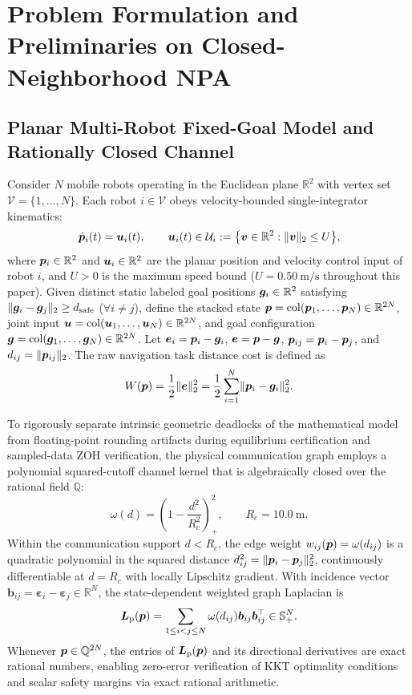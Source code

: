 \section{Problem Formulation and Preliminaries on Closed-Neighborhood NPA}\label{sec:model}

\subsection{Planar Multi-Robot Fixed-Goal Model and Rationally Closed Channel}
Consider $N$ mobile robots operating in the Euclidean plane $\mathbb R^2$ with vertex set $\mathcal V=\{1,\dots,N\}$. Each robot $i\in\mathcal V$ obeys velocity-bounded single-integrator kinematics:
\begin{equation}
 \dot{\boldsymbol{p}}_i(t)=\boldsymbol{u}_i(t),\qquad \boldsymbol{u}_i(t)\in\mathcal U_i:=\big\{\boldsymbol v\in\mathbb R^2:\lVert\boldsymbol v\rVert_2\le U\big\},
 \label{eq:kinematics}
\end{equation}
where $\boldsymbol{p}_i\in\mathbb R^2$ and $\boldsymbol{u}_i\in\mathbb R^2$ are the planar position and velocity control input of robot $i$, and $U>0$ is the maximum speed bound ($U=0.50\ \mathrm{m/s}$ throughout this paper). Given distinct static labeled goal positions $\boldsymbol{g}_i\in\mathbb R^2$ satisfying $\lVert\boldsymbol{g}_i-\boldsymbol{g}_j\rVert_2\ge d_{\mathrm{safe}}$ ($\forall i\ne j$), define the stacked state $\boldsymbol{p}=\operatorname{col}(\boldsymbol{p}_1,\dots,\boldsymbol{p}_N)\in\mathbb R^{2N}$, joint input $\boldsymbol{u}=\operatorname{col}(\boldsymbol{u}_1,\dots,\boldsymbol{u}_N)\in\mathbb R^{2N}$, and goal configuration $\boldsymbol{g}=\operatorname{col}(\boldsymbol{g}_1,\dots,\boldsymbol{g}_N)\in\mathbb R^{2N}$. Let $\boldsymbol{e}_i=\boldsymbol{p}_i-\boldsymbol{g}_i$, $\boldsymbol{e}=\boldsymbol{p}-\boldsymbol{g}$, $\boldsymbol{p}_{ij}=\boldsymbol{p}_i-\boldsymbol{p}_j$, and $d_{ij}=\lVert\boldsymbol{p}_{ij}\rVert_2$. The raw navigation task distance cost is defined as
\begin{equation}
 W(\boldsymbol{p})=\frac12\lVert\boldsymbol{e}\rVert_2^2=\frac12\sum_{i=1}^N\lVert\boldsymbol{p}_i-\boldsymbol{g}_i\rVert_2^2.
 \label{eq:W-def}
\end{equation}

To rigorously separate intrinsic geometric deadlocks of the mathematical model from floating-point rounding artifacts during equilibrium certification and sampled-data ZOH verification, the physical communication graph employs a polynomial squared-cutoff channel kernel that is algebraically closed over the rational field $\mathbb Q$:
\begin{equation}
 \omega(d)=\left(1-\frac{d^2}{R_c^2}\right)_+^2,\qquad R_c=10.0\ \mathrm m.
 \label{eq:poly-channel}
\end{equation}
Within the communication support $d<R_c$, the edge weight $w_{ij}(\boldsymbol{p})=\omega(d_{ij})$ is a quadratic polynomial in the squared distance $d_{ij}^2=\lVert\boldsymbol{p}_i-\boldsymbol{p}_j\rVert_2^2$, continuously differentiable at $d=R_c$ with locally Lipschitz gradient. With incidence vector $\boldsymbol b_{ij}=\boldsymbol\varepsilon_i-\boldsymbol\varepsilon_j\in\mathbb R^N$, the state-dependent weighted graph Laplacian is
\begin{equation}
 \boldsymbol{L}_{\mathrm{p}}(\boldsymbol{p})=\sum_{1\le i<j\le N}\omega(d_{ij})\boldsymbol b_{ij}\boldsymbol b_{ij}^{\top}\in\mathbb S_+^N.
 \label{eq:laplacian}
\end{equation}
Whenever $\boldsymbol{p}\in\mathbb Q^{2N}$, the entries of $\boldsymbol{L}_{\mathrm{p}}(\boldsymbol{p})$ and its directional derivatives are exact rational numbers, enabling zero-error verification of KKT optimality conditions and scalar safety margins via exact rational arithmetic.

